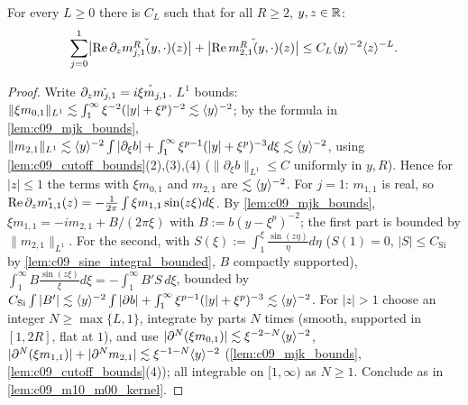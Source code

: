 \begin{lemma}[Kernels with $k=1$]
  \label{lem:c09_k1_kernels}
  For every $L\ge0$ there is $C_L$ such that for all $R\ge2$, $y,z\in\R$:
  \[
    \sum_{j=0}^1\bigl|\operatorname{Re}\partial_z\widecheck{m^R_{j,1}(y,\cdot)}(z)\bigr|+\bigl|\operatorname{Re}\widecheck{m^R_{2,1}(y,\cdot)}(z)\bigr|\le C_L\ang{y}^{-2}\ang z^{-L}.
  \]
\end{lemma}
\begin{proof}
  Write $\partial_z\widecheck{m_{j,1}}=\widecheck{i\xi m_{j,1}}$. $L^1$ bounds: $\|\xi m_{0,1}\|_{L^1}\lesssim\int_1^\infty\xi^{-2}(|y|+\xi^p)^{-2}\lesssim\ang y^{-2}$; by the formula
  in \cref{lem:c09_mjk_bounds}, $\|m_{2,1}\|_{L^1}\lesssim\ang{y}^{-2}\int|\partial_\xi b|+\int_1^\infty\xi^{p-1}(|y|+\xi^p)^{-3}d\xi\lesssim\ang{y}^{-2}$, using
  \cref{lem:c09_cutoff_bounds}(2),(3),(4) ($\|\partial_\xi b\|_{L^1}\le C$ uniformly in $y,R$). Hence for $|z|\le1$ the terms with $\xi m_{0,1}$ and $m_{2,1}$ are $\lesssim\ang y^{-2}$.
  For $j=1$: $m_{1,1}$ is real, so $\operatorname{Re}\partial_z\widecheck{m_{1,1}}(z)=-\frac1{2\pi}\int\xi m_{1,1}\sin(z\xi)d\xi$. By \cref{lem:c09_mjk_bounds},
  $\xi m_{1,1}=-im_{2,1}+B/(2\pi\xi)$ with $B:=b(y-\xi^p)^{-2}$; the first part is bounded by $\|m_{2,1}\|_{L^1}$. For the second, with
  $S(\xi):=\int_1^\xi\frac{\sin(z\eta)}{\eta}d\eta$ ($S(1)=0$, $|S|\le C_{\mathrm{Si}}$ by \cref{lem:c09_sine_integral_bounded}, $B$ compactly supported),
  $\int_1^\infty B\frac{\sin(z\xi)}{\xi}d\xi=-\int_1^\infty B'S\,d\xi$, bounded by $C_{\mathrm{Si}}\int|B'|\lesssim\ang{y}^{-2}\int|\partial b|+\int_1^\infty\xi^{p-1}(|y|+\xi^p)^{-3}\lesssim\ang y^{-2}$.
  For $|z|>1$ choose an integer $N\ge\max\{L,1\}$, integrate by parts $N$ times (smooth, supported in $[1,2R]$, flat at $1$), and use $|\partial^N(\xi m_{0,1})|\lesssim\xi^{-2-N}\ang y^{-2}$,
  $|\partial^N(\xi m_{1,1})|+|\partial^N m_{2,1}|\lesssim\xi^{-1-N}\ang{y}^{-2}$ (\cref{lem:c09_mjk_bounds}, \cref{lem:c09_cutoff_bounds}(4)); all integrable on $[1,\infty)$ as $N\ge1$.
  Conclude as in \cref{lem:c09_m10_m00_kernel}.
\end{proof}

